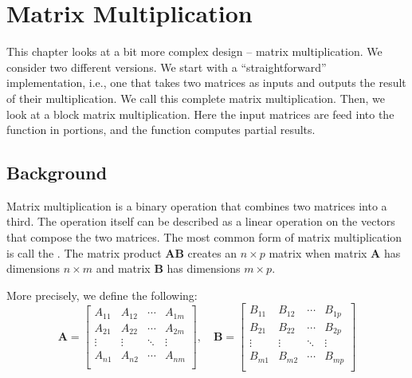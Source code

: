 
\chapter{Matrix Multiplication}
\glsresetall
\label{chapter:matrix_multiplication}

This chapter looks at a bit more complex design -- matrix multiplication. We consider two different versions. We start with a ``straightforward'' implementation, i.e., one that takes two matrices as inputs and outputs the result of their multiplication. We call this complete matrix multiplication. Then, we look at a block matrix multiplication. Here the input matrices are feed into the function in portions, and the function computes partial results.

\section{Background}

Matrix multiplication is a binary operation that combines two matrices into a third. The operation itself can be described as a linear operation on the vectors that compose the two matrices. The most common form of matrix multiplication is call the . The matrix product $\mathbf{AB}$ creates an $n \times p$ matrix when matrix $\mathbf{A}$ has dimensions $n \times m$ and matrix $\mathbf{B}$ has dimensions $m \times p$. 

More precisely, we define the following: \begin{equation}
\mathbf{A} =
 \begin{bmatrix}
  A_{11} & A_{12}  & \cdots & A_{1m} \\
  A_{21} & A_{22}  & \cdots & A_{2m} \\
  \vdots  & \vdots  &\ddots & \vdots  \\
    A_{n1} & A_{n2}  & \cdots & A_{nm} \\
 \end{bmatrix},  \quad
\mathbf{B} =
 \begin{bmatrix}
  B_{11} & B_{12}  & \cdots & B_{1p} \\
  B_{21} & B_{22}  & \cdots & B_{2p} \\
  \vdots  & \vdots   &\ddots & \vdots  \\
  B_{m1} & B_{m2}  & \cdots & B_{mp} \\
 \end{bmatrix}
\end{equation} 

